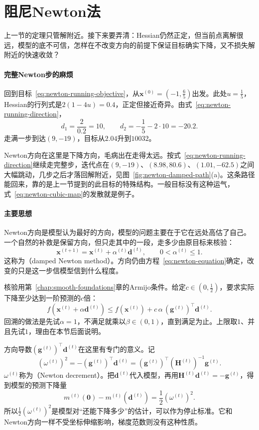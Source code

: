 \section{阻尼Newton法}
\label{sec:newton-damped}

上一节的定理只管解附近。接下来要弄清：Hessian仍然正定，但当前点离解很远，模型的底不可信，怎样在不改变方向的前提下保证目标确实下降，又不损失解附近的快速收敛？

\paragraph{完整Newton步的麻烦}
回到目标~\eqref{eq:newton-running-objective}，从$\bm{x}^{(0)}=(-1,\tfrac65)$出发。此处$u=\tfrac15$，Hessian的行列式是$2(1-4u)=0.4$，正定但接近奇异。由式~\eqref{eq:newton-running-direction}，
\[
 d_1=\frac{2}{0.2}=10,\qquad d_2=-\frac15-2\cdot10=-20.2.
\]
走满一步到达$(9,-19)$，目标从$2.04$升到$10032$。

Newton方向在这里是下降方向，毛病出在走得太远。按式~\eqref{eq:newton-running-direction}继续走完整步，迭代点在$(9,-19)$、$(8.98,80.6)$、$(1.01,-62.5)$之间大幅跳动，几步之后才落回解附近，见图~\ref{fig:newton-damped-path}(a)。这条路径能回来，靠的是上一节提到的此目标的特殊结构。一般目标没有这种运气，式~\eqref{eq:newton-cubic-map}的发散就是例子。

\paragraph{主要思想}
Newton方向是模型认为最好的方向，模型的问题主要在于它在远处高估了自己。一个自然的补救是保留方向，但只走其中的一段，走多少由原目标来核验：
\begin{equation}
 \bm{x}^{(t+1)}=\bm{x}^{(t)}+\alpha^{(t)}\bm{d}^{(t)},\qquad 0<\alpha^{(t)}\leq1.
 \label{eq:newton-damped-update}
\end{equation}
这称为（damped Newton method）。方向仍由方程~\eqref{eq:newton-equation}确定，改变的只是这一步信模型信到什么程度。

核验用第~\ref{chap:smooth-foundations}章的Armijo条件。给定$c\in(0,\tfrac12)$，要求实际下降至少达到一阶预测的$c$倍：
\begin{equation}
 f(\bm{x}^{(t)}+\alpha\bm{d}^{(t)})\leq f(\bm{x}^{(t)})+c\,\alpha\,(\bm{g}^{(t)})^\top\bm{d}^{(t)}.
 \label{eq:newton-armijo}
\end{equation}
回溯的做法是先试$\alpha=1$，不满足就乘以$\beta\in(0,1)$，直到满足为止。上限取$1$、并且先试$1$，理由在本节后面说明。

方向导数$(\bm{g}^{(t)})^\top\bm{d}^{(t)}$在这里有专门的意义。记
\begin{equation}
 (\omega^{(t)})^2=-(\bm{g}^{(t)})^\top\bm{d}^{(t)}=(\bm{g}^{(t)})^\top(\bm{H}^{(t)})^{-1}\bm{g}^{(t)}.
 \label{eq:newton-decrement}
\end{equation}
$\omega^{(t)}$称为（Newton decrement）。把$\bm{d}^{(t)}$代入模型，再用$\bm{H}^{(t)}\bm{d}^{(t)}=-\bm{g}^{(t)}$，得到模型的预测下降量
\[
 m^{(t)}(\bm{0})-m^{(t)}(\bm{d}^{(t)})=\frac12(\omega^{(t)})^2.
\]
所以$\tfrac12(\omega^{(t)})^2$是模型对“还能下降多少”的估计，可以作为停止标准。它和Newton方向一样不受坐标伸缩影响，梯度范数则没有这种性质。

